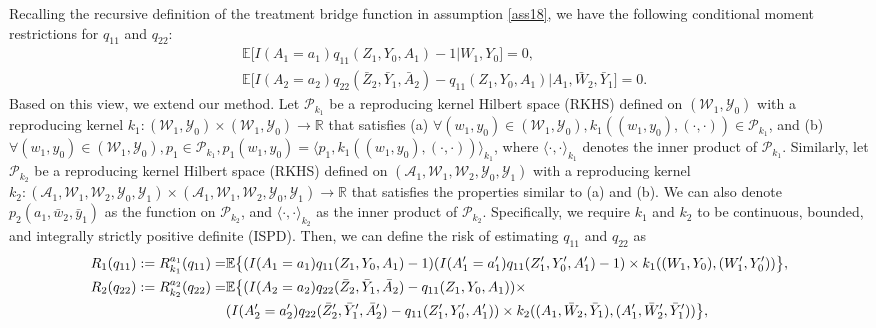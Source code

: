 \documentclass[10pt]{article}
\theoremstyle{remark} \newtheorem{rem}{Remark}
\begin{document}
Recalling the recursive definition of the treatment bridge function in assumption \ref{ass18}, we have the following conditional moment restrictions for $q_{11}$ and $q_{22}$:
\begin{align}
    & \mathbb{E}\big[I(A_1=a_1)q_{11}(Z_1, Y_0, A_1)-1|W_1,Y_0\big] = 0, \\
    & \mathbb{E}\big[I(A_2=a_2)q_{22}(\bar Z_2, \bar Y_1, \bar A_2)- q_{11}(Z_1, Y_0, A_1)|A_1, \bar W_2,\bar Y_1\big] = 0.
\end{align}
Based on this view, we extend our method.
Let $\mathcal{P}_{k_1}$ be a reproducing kernel Hilbert space (RKHS) defined on $(\mathcal{W}_1, \mathcal{Y}_0)$ with a reproducing kernel $k_1:(\mathcal{W}_1, \mathcal{Y}_0)\times (\mathcal{W}_1, \mathcal{Y}_0) \to \mathbb{R}$ that satisfies
(a) $\forall (w_1,y_0)\in (\mathcal{W}_1, \mathcal{Y}_0), k_1((w_1,y_0),(\cdot,\cdot)) \in \mathcal{P}_{k_1}$, and 
(b) $\forall (w_1,y_0)\in(\mathcal{W}_1, \mathcal{Y}_0),p_1\in\mathcal{P}_{k_1},  p_1(w_1,y_0)= \langle p_1,k_1((w_1,y_0),(\cdot,\cdot))\rangle_{k_1}$,
where $\langle\cdot,\cdot\rangle_{k_1}$ denotes the inner product of $\mathcal{P}_{k_1}$. 
Similarly, let $\mathcal{P}_{k_2}$ be a reproducing kernel Hilbert space (RKHS) defined on $(\mathcal{A}_1,\mathcal{W}_1,\mathcal{W}_2, \mathcal{Y}_0, \mathcal{Y}_1)$ with a reproducing kernel $k_2:(\mathcal{A}_1,\mathcal{W}_1,\mathcal{W}_2, \mathcal{Y}_0, \mathcal{Y}_1)\times (\mathcal{A}_1,\mathcal{W}_1,\mathcal{W}_2, \mathcal{Y}_0, \mathcal{Y}_1) \to \mathbb{R}$ that satisfies the properties similar to (a) and (b). We can also denote $p_2(a_1,\bar w_2,\bar y_1)$ as the function on $\mathcal{P}_{k_2}$, and $\langle\cdot,\cdot\rangle_{k_2}$ as the inner product of $\mathcal{P}_{k_2}$.
Specifically, we require $k_1$ and $k_2$ to be continuous, bounded, and integrally strictly positive definite (ISPD).
Then, we can define the risk of estimating $q_{11}$ and $q_{22}$ as
\begin{align}
    R_1(q_{11}):= R^{a_1}_{k_1}(q_{11})=& \mathbb{E}\big\{(I(A_1=a_1)q_{11}(Z_1,Y_0,A_1)-1) (I(A_1'=a_1')q_{11}(Z_1',Y_0',A_1')-1)\times k_1((W_1,Y_0),(W_1',Y_0'))  \big\}, \\
    R_2(q_{22}):= R^{a_2}_{k_2}(q_{22})=& \mathbb{E}\big\{(I(A_2=a_2)q_{22}(\bar Z_2,\bar Y_1,\bar A_2)-q_{11}(Z_1,Y_0,A_1)) \times \notag\\
    & (I(A_2'=a_2')q_{22}(\bar Z_2',\bar Y_1',\bar A_2')-q_{11}(Z_1',Y_0',A_1'))\times k_2((A_1, \bar W_2,\bar Y_1),(A_1', \bar W_2',\bar Y_1'))  \big\},
\end{align}
\end{document}
